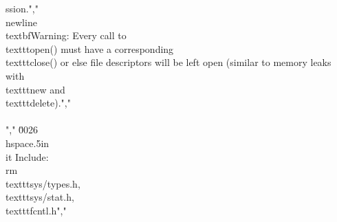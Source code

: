 ssion.","    \\newline\\textbf{Warning:} Every call to \\texttt{open()} must have a corresponding \\texttt{close()} or else file descriptors will be left open (similar to memory leaks with \\texttt{new} and \\texttt{delete}).","        \\\\","    \u0026 \\hspace{.5in}\\it Include: \\rm\\texttt{sys/types.h}, \\texttt{sys/stat.h}, \\texttt{fcntl.h}","        %
